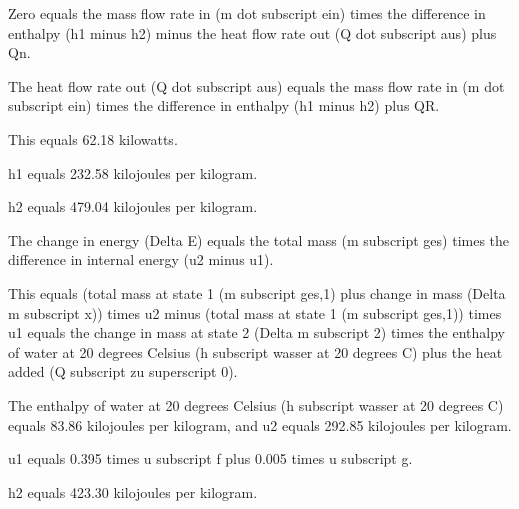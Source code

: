 Zero equals the mass flow rate in (m dot subscript ein) times the difference in enthalpy (h1 minus h2) minus the heat flow rate out (Q dot subscript aus) plus Qn.

The heat flow rate out (Q dot subscript aus) equals the mass flow rate in (m dot subscript ein) times the difference in enthalpy (h1 minus h2) plus QR.

This equals 62.18 kilowatts.

h1 equals 232.58 kilojoules per kilogram.

h2 equals 479.04 kilojoules per kilogram.

The change in energy (Delta E) equals the total mass (m subscript ges) times the difference in internal energy (u2 minus u1).

This equals (total mass at state 1 (m subscript ges,1) plus change in mass (Delta m subscript x)) times u2 minus (total mass at state 1 (m subscript ges,1)) times u1 equals the change in mass at state 2 (Delta m subscript 2) times the enthalpy of water at 20 degrees Celsius (h subscript wasser at 20 degrees C) plus the heat added (Q subscript zu superscript 0).

The enthalpy of water at 20 degrees Celsius (h subscript wasser at 20 degrees C) equals 83.86 kilojoules per kilogram, and u2 equals 292.85 kilojoules per kilogram.

u1 equals 0.395 times u subscript f plus 0.005 times u subscript g.

h2 equals 423.30 kilojoules per kilogram.